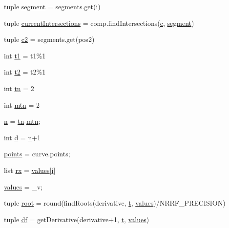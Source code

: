 \begin{DoxyCompactItemize}
\item 
tuple \hyperlink{namespacebezier_ae4beec9a717adf1c578294a19edbca65}{segment} = segments.\+get(\hyperlink{namespacebezier_a928e2d96e49d7898d0f47903caf0f866}{i})
\item 
tuple \hyperlink{namespacebezier_a58fa425c725113cb9f5504c6c3603dec}{current\+Intersections} = comp.\+find\+Intersections(\hyperlink{namespacebezier_acdfb18e445ac8e833eda8fb411fe7373}{c}, \hyperlink{namespacebezier_ae4beec9a717adf1c578294a19edbca65}{segment})
\item 
tuple \hyperlink{namespacebezier_a508894c735abb837df1774cee031b231}{c2} = segments.\+get(pos2)
\item 
int \hyperlink{namespacebezier_aabfbe79208c73c8e1d3c9b14c0d2a5b8}{t1} = t1\%1
\item 
int \hyperlink{namespacebezier_a73e5c5dcb6bf619524a72f09d6bcd15b}{t2} = t2\%1
\item 
int \hyperlink{namespacebezier_a7bc830cadb0e4876722b68296da442d0}{tn} = 2
\item 
int \hyperlink{namespacebezier_a8f2a3ea08791f163da137639e5cac244}{mtn} = 2
\item 
\hyperlink{namespacebezier_a6af7fcd36e64d55245071a38cffbae33}{n} = \hyperlink{namespacebezier_a7bc830cadb0e4876722b68296da442d0}{tn}-\/\hyperlink{namespacebezier_a8f2a3ea08791f163da137639e5cac244}{mtn};
\item 
int \hyperlink{namespacebezier_a6d52742576263b89b839a5e3cbc68ef1}{d} = \hyperlink{namespacebezier_a6af7fcd36e64d55245071a38cffbae33}{n}+1
\item 
\hyperlink{namespacebezier_a83cd11a8fa14a0feb1b8bf9beb29f92d}{points} = curve.\+points;
\item 
list \hyperlink{namespacebezier_a1842cea8a4b02363c663c007716e5837}{rx} = \hyperlink{namespacebezier_a503cbe2696a09601b3361ae9cff46771}{values}\mbox{[}\hyperlink{namespacebezier_a928e2d96e49d7898d0f47903caf0f866}{i}\mbox{]}
\item 
\hyperlink{namespacebezier_a503cbe2696a09601b3361ae9cff46771}{values} = \+\_\+v;
\item 
tuple \hyperlink{namespacebezier_a64145e7ef3e125162f1139dd32325fa1}{root} = round(find\+Roots(derivative, \hyperlink{namespacebezier_a21309dd6a23cee0f4b3888de7b66b7ff}{t}, \hyperlink{namespacebezier_a503cbe2696a09601b3361ae9cff46771}{values})/N\+R\+R\+F\+\_\+\+P\+R\+E\+C\+I\+S\+I\+O\+N)
\item 
tuple \hyperlink{namespacebezier_a25e79f92e794bbc94fad7d80d53bd07c}{df} = get\+Derivative(derivative+1, \hyperlink{namespacebezier_a21309dd6a23cee0f4b3888de7b66b7ff}{t}, \hyperlink{namespacebezier_a503cbe2696a09601b3361ae9cff46771}{values})

\end{DoxyCompactItemize}
